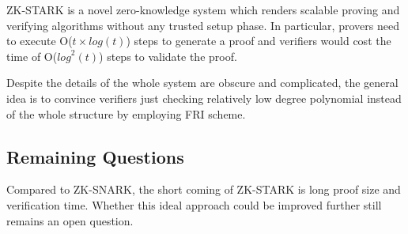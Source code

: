 \documentclass[conference]{IEEEtran}
\begin{document}
ZK-STARK is a novel zero-knowledge system which renders scalable proving and verifying algorithms without any trusted setup phase.
%
In particular, provers need to execute O($t{\times}log(t)$) steps to generate a proof and verifiers would cost the time of O(${log}^2(t)$) steps to validate the proof.

Despite the details of the whole system are obscure and complicated, the general idea is to convince verifiers just checking relatively low degree polynomial instead of the whole structure by employing FRI scheme.

\subsection{Remaining Questions}
Compared to ZK-SNARK, the short coming of ZK-STARK is long proof size and verification time.
%
Whether this ideal approach could be improved further still remains an open question. 



\end{document}
